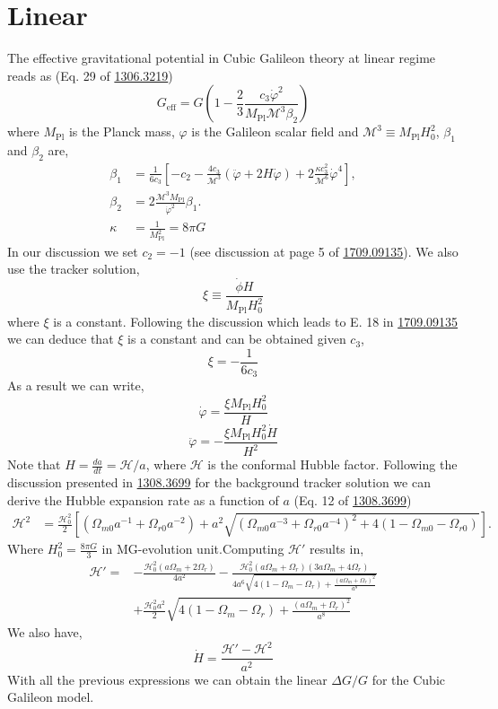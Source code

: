 \documentclass{article}
\def\be{\begin{equation}}
\def\ee{\end{equation}}
\begin{document}
\section{Linear }
The effective gravitational potential in Cubic Galileon theory at linear regime reads as (Eq. 29 of \href{https://arxiv.org/abs/1306.3219}{1306.3219})
\be
G_{\mathrm{eff}}=G\left(1-\frac{2}{3} \frac{c_3 \dot{\varphi}^2}{M_{\mathrm{Pl}} \mathcal{M}^3 \beta_2}\right)
\ee
where $M_{\mathrm{Pl}}$ is the Planck mass, $\varphi$ is the Galileon scalar field and $\mathcal{M}^3 \equiv M_{\mathrm{Pl}} H_0^2$, $\beta_1$ and $\beta_2$ are,
\begin{align*}
\beta_1 &= \frac{1}{6 c_3}\left[-c_2 - \frac{4 c_3}{\mathcal{M}^3}(\ddot{\varphi}+2 H \dot{\varphi}) + 2 \frac{\kappa c_3^2}{\mathcal{M}^6} \dot{\varphi}^4\right], \\
\beta_2 &= 2 \frac{\mathcal{M}^3 M_{\mathrm{Pl}}}{\dot{\varphi}^2} \beta_1. \\
\kappa &= \frac{1}{M_{\mathrm{Pl}}^2} = 8 \pi G
\end{align*}
In our discussion we set $c_2 = -1$ (see discussion at page 5 of \href{https://arxiv.org/pdf/1709.09135.pdf}{1709.09135}). We also use the tracker solution,
\be
\xi \equiv \frac{\dot{\phi} H}{M_{\mathrm{Pl}} H_0^2}
\ee
where $\xi$ is a constant. Following the discussion which leads to E. 18 in \href{https://arxiv.org/pdf/1709.09135.pdf} {1709.09135} we can deduce that $\xi$ is a constant and can be obtained given $c_3$,
\be
\xi = -\frac{1}{6 c_3}
\ee
As a result we can write,
\be
\dot{\varphi} =   \frac{\xi M_{\mathrm{Pl}} H_0^2}{H} 
\ee
\be
\ddot{\varphi} =  - \frac{\xi M_{\mathrm{Pl}} H_0^2 \dot{H}}{H^2} 
\ee
Note that $H = \frac{d a}{dt} = \mathcal{H}/a$, where $\mathcal{H}$ is the conformal Hubble factor. Following the discussion presented in \href{https://arxiv.org/pdf/1308.3699.pdf}{1308.3699} for the background tracker solution we can derive the Hubble expansion rate as a function of $a$ (Eq. 12 of \href{https://arxiv.org/pdf/1308.3699.pdf}{1308.3699})
\begin{equation}
\begin{aligned}
\mathcal{H}^2 &= \frac{\mathcal{H}_0^2}{2}\left[\left(\Omega_{m0} a^{-1} + \Omega_{r0} a^{-2}\right) + a^2 \sqrt{\left(\Omega_{m0} a^{-3} + \Omega_{r0} a^{-4}\right)^2 + 4\left(1 - \Omega_{m0} - \Omega_{r0}\right)}\right].
\end{aligned}
\end{equation}
Where $H_0^2 = \frac{8 \pi G}{3}$ in MG-evolution unit.Computing $\mathcal{H}'$ results in,
\begin{equation}
\begin{aligned}
\mathcal{H}' = & -\frac{\mathcal{H}_0^2 (a \Omega_m + 2 \Omega_r)}{4 a^2} 
 - \frac{\mathcal{H}_0^2(a \Omega_m + \Omega_r) (3 a \Omega_m + 4 \Omega_r)}{4 a^6 \sqrt{4 (1 - \Omega_m - \Omega_r) + \frac{(a \Omega_m + \Omega_r)^2}{a^8}}} \\
& + \frac{\mathcal{H}_0^2 a^2}{2} \sqrt{4 (1 - \Omega_m - \Omega_r) + \frac{(a \Omega_m + \Omega_r)^2}{a^8}}
\end{aligned}
\end{equation}
We also have,
\be
\dot{H} = \frac{\mathcal{H}' - \mathcal{H}^2}{a^2}
\ee
With all the previous expressions we can obtain the linear $\Delta G/G$ for the Cubic Galileon model. 
\end{document}
